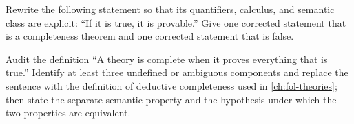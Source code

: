 \begin{exercise}
\label{ex:writing-foundations-01}
Rewrite the following statement so that its quantifiers, calculus, and semantic
class are explicit: ``If it is true, it is provable.''  Give one corrected
statement that is a completeness theorem and one corrected statement that is
false.
\end{exercise}

\begin{exercise}
\label{ex:writing-foundations-02}
Audit the definition ``A theory is complete when it proves everything that is
true.''  Identify at least three undefined or ambiguous components and replace
the sentence with the definition of deductive completeness used in
\cref{ch:fol-theories}; then state the separate semantic property and the
hypothesis under which the two properties are equivalent.
\end{exercise}

